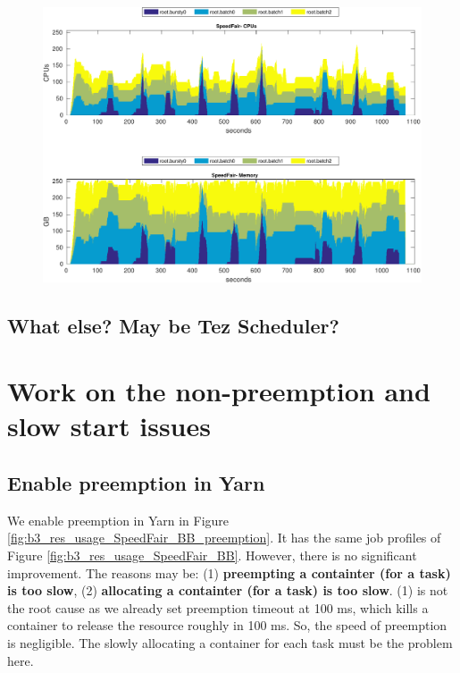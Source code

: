 \begin{figure}
\centering
\includegraphics[width=1.0\linewidth]{fig/b3_res_usage_SpeedFair_BB_5s}
\caption{}
\label{fig:b3_res_usage_SpeedFair_BB_3s}
\end{figure}

\subsection{What else? May be Tez Scheduler?}



\newpage

\section{Work on the non-preemption and slow start issues}

\subsection{Enable preemption in Yarn}

We enable preemption in Yarn in Figure \ref{fig:b3_res_usage_SpeedFair_BB_preemption}. It has the same job profiles of Figure \ref{fig:b3_res_usage_SpeedFair_BB}. However, there is no significant improvement. The reasons may be: (1) \textbf{preempting a containter (for a task) is too slow}, (2) \textbf{allocating a containter (for a task) is too slow}. (1) is not the root cause as we already set preemption timeout at 100 ms, which kills a container to release the resource roughly in 100 ms. So, the speed of preemption is negligible. The slowly allocating a container for each task must be the problem here.


